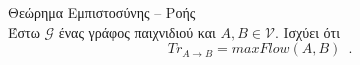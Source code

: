 {}
\begin{theoremgr}{Θεώρημα Εμπιστοσύνης -- Ροής} \ \\
  \label{trustflow}
  Έστω $\mathcal{G}$ ένας γράφος παιχνιδιού και $A, B \in \mathcal{V}$. Ισχύει ότι
  \begin{equation*}
    Tr_{A \rightarrow B} = maxFlow\left(A, B\right) \enspace.
  \end{equation*}
\end{theoremgr}
